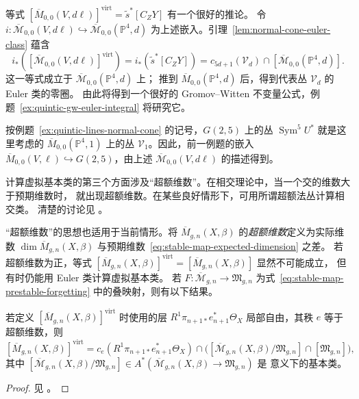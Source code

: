 \begin{example}
等式 $[\overline M_{0,0}(V,d\ell)]^{\mathrm{virt}}=\widetilde s^*[C_ZY]$ 有一个很好的推论。
令 $i:\overline{\mathcal M}_{0,0}(V,d\ell)\hookrightarrow
\overline{\mathcal M}_{0,0}(\mathbb P^4,d)$ 为上述嵌入。引理~\ref{lem:normal-cone-euler-class} 蕴含
\begin{equation}\label{eq:quintic-virtual-class-pushforward}
i_*([\overline{\mathcal M}_{0,0}(V,d\ell)]^{\mathrm{virt}})
=i_*(\widetilde s^*[C_ZY])
=c_{5d+1}(\mathcal V_d)\cap[\overline{\mathcal M}_{0,0}(\mathbb P^4,d)].
\end{equation}
这一等式成立于 $\overline{\mathcal M}_{0,0}(\mathbb P^4,d)$ 上；
推到 $\overline M_{0,0}(\mathbb P^4,d)$ 后，得到代表丛 $\mathcal V_d$ 的 Euler 类的零圈。
由此将得到一个很好的 Gromov--Witten 不变量公式，例题~\ref{ex:quintic-gw-euler-integral} 将研究它。

按例题~\ref{ex:quintic-lines-normal-cone} 的记号，$G(2,5)$ 上的丛
$\operatorname{Sym}^5U^*$ 就是这里考虑的 $\overline M_{0,0}(\mathbb P^4,1)$ 上的丛
$\mathcal V_1$。因此，前一例题的嵌入
$\overline M_{0,0}(V,\ell)\hookrightarrow G(2,5)$，由上述
$\overline{\mathcal M}_{0,0}(V,d\ell)$ 的描述得到。
\end{example}

计算虚拟基本类的第三个方面涉及“超额维数”。在相交理论中，当一个交的维数大于预期维数时，
就出现超额维数。在某些良好情形下，可用所谓超额法丛计算相交类。
清楚的讨论见 。

“超额维数”的思想也适用于当前情形。将
$\overline M_{g,n}(X,\beta)$ 的\emph{超额维数}定义为实际维数
$\dim\overline M_{g,n}(X,\beta)$ 与预期维数~\eqref{eq:stable-map-expected-dimension} 之差。
若超额维数为正，等式
$[\overline M_{g,n}(X,\beta)]^{\mathrm{virt}}=[\overline M_{g,n}(X,\beta)]$ 显然不可能成立，
但有时仍能用 Euler 类计算虚拟基本类。
若 $F:\overline{\mathcal M}_{g,n}\to\mathfrak M_{g,n}$ 为式~\eqref{eq:stable-map-prestable-forgetting}
中的叠映射，则有以下结果。

\begin{proposition}\label{prop:excess-obstruction-euler-class}
若定义 $[\overline M_{g,n}(X,\beta)]^{\mathrm{virt}}$ 时使用的层
$R^1\pi_{n+1*}e_{n+1}^*\Theta_X$ 局部自由，其秩 $e$ 等于超额维数，则
\[
[\overline M_{g,n}(X,\beta)]^{\mathrm{virt}}
=c_e(R^1\pi_{n+1*}e_{n+1}^*\Theta_X)
\cap\bigl([\overline{\mathcal M}_{g,n}(X,\beta)/\mathfrak M_{g,n}]
\cap[\mathfrak M_{g,n}]\bigr),
\]
其中 $[\overline{\mathcal M}_{g,n}(X,\beta)/\mathfrak M_{g,n}]
\in A^*(\overline{\mathcal M}_{g,n}(X,\beta)\to\mathfrak M_{g,n})$
是  意义下的基本类。
\end{proposition}
\begin{proof}
见 。
\end{proof}

